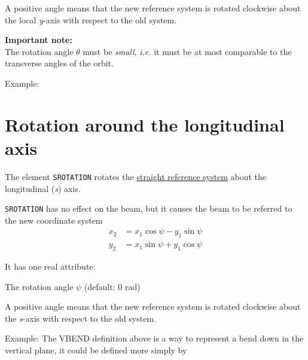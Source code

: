 A positive angle means that the new reference system is rotated
clockwise about the local \textit{y}-axis with respect to the old system. 

\textbf{Important note:} \\
The rotation angle $\theta$ must be \emph{small}, \textsl{i.e.} it must be at
most comparable to the transverse angles of the orbit. 

Example: 

\section{Rotation around the longitudinal axis}
\label{sec:srotation}

The element \texttt{SROTATION} rotates the
\hyperref[subsec:local-straight]{straight reference system} about the
longitudinal (\textit{s}) axis. 


\texttt{SROTATION} has no effect on the beam, but it causes the beam to be 
referred to the new coordinate system \\ 
\begin{equation}\begin{split}
x_2 &= x_1 \cos\psi - y_1 \sin\psi \\
y_2 &= x_1 \sin\psi + y_1 \cos\psi
\end{split}\end{equation}


It has one real attribute: 
\begin{madlist}
    The rotation angle $\psi$ (default: 0 rad) 
\end{madlist}

A positive angle means that the new reference system is rotated
clockwise about the \textit{s}-axis with respect to the old system.  

Example: 
The VBEND definition above is a way to represent a bend down in the
vertical plane, it could be defined more simply by  

